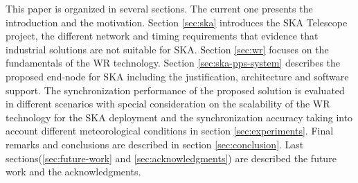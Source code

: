 This paper is organized in several sections. The current one 
presents the introduction and the motivation. Section \ref{sec:ska} introduces the SKA Telescope project, the different network and timing requirements that evidence that industrial solutions are not suitable for SKA. Section \ref{sec:wr} focuses on the fundamentals of the WR technology. Section \ref{sec:ska-pps-system} describes the proposed end-node for SKA including the justification, architecture and software support. The synchronization performance of the proposed solution is evaluated in different scenarios with special consideration on the scalability of the WR technology for the SKA deployment and the synchronization accuracy taking into account different meteorological conditions in section \ref{sec:experiments}. Final remarks and conclusions are described in section \ref{sec:conclusion}. Last sections(\ref{sec:future-work} and \ref{sec:acknowledgments}) are described the future work and the acknowledgments.


